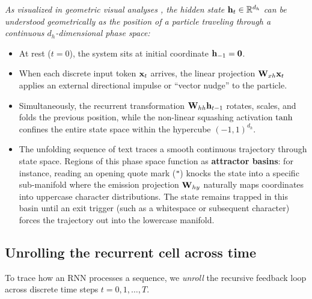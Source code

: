 \documentclass[../../main.tex]{subfiles}
\begin{document}
\medskip

\textit{As visualized in geometric visual analyses \cite{sanderson2024embeddings}, the hidden state $\mathbf{h}_t \in \mathbb{R}^{d_h}$ can be understood geometrically as the position of a particle traveling through a continuous $d_h$-dimensional phase space:}
\begin{itemize}
    \item At rest ($t=0$), the system sits at initial coordinate $\mathbf{h}_{-1} = \mathbf{0}$.
    \item When each discrete input token $\mathbf{x}_t$ arrives, the linear projection $\mathbf{W}_{xh} \mathbf{x}_t$ applies an external directional impulse or ``vector nudge'' to the particle.
    \item Simultaneously, the recurrent transformation $\mathbf{W}_{hh} \mathbf{h}_{t-1}$ rotates, scales, and folds the previous position, while the non-linear squashing activation $\tanh$ confines the entire state space within the hypercube $(-1, 1)^{d_h}$.
    \item The unfolding sequence of text traces a smooth continuous trajectory through state space. Regions of this phase space function as \textbf{attractor basins}: for instance, reading an opening quote mark (\texttt{"}) knocks the state into a specific sub-manifold where the emission projection $\mathbf{W}_{hy}$ naturally maps coordinates into uppercase character distributions. The state remains trapped in this basin until an exit trigger (such as a whitespace or subsequent character) forces the trajectory out into the lowercase manifold.
\end{itemize}

\subsection{Unrolling the recurrent cell across time}
To trace how an RNN processes a sequence, we \emph{unroll} the recursive feedback loop across discrete time steps $t = 0, 1, \dots, T$.
\end{document}
